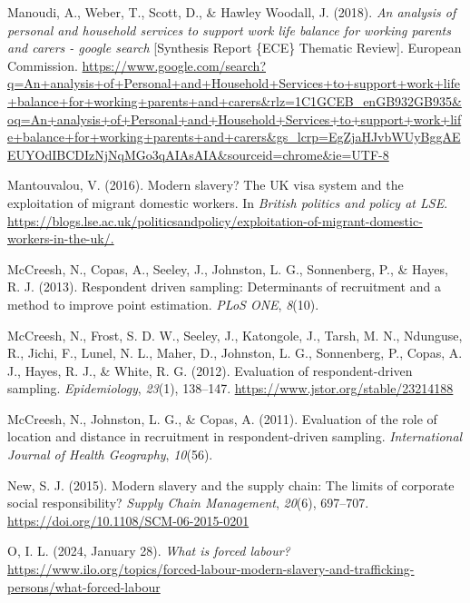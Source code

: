 \documentclass[
  12pt,
]{article}
\newlength{\cslhangindent}
\newenvironment{CSLReferences}[2] %
 {\begin{list}{}{%
  \setlength{\itemindent}{0pt}
  \setlength{\leftmargin}{0pt}
  \setlength{\parsep}{0pt}
  \ifodd #1
   \setlength{\leftmargin}{\cslhangindent}
   \setlength{\itemindent}{-1\cslhangindent}
  \fi
  \setlength{\itemsep}{#2\baselineskip}}}
 {\end{list}}
\theoremstyle{plain}
\theoremstyle{definition}
\begin{document}
\begin{CSLReferences}{1}{0}
Manoudi, A., Weber, T., Scott, D., \& Hawley Woodall, J. (2018).
\emph{An analysis of personal and household services to support work
life balance for working parents and carers - google search}
{[}Synthesis Report \{ECE\} Thematic Review{]}. European Commission.
\url{https://www.google.com/search?q=An+analysis+of+Personal+and+Household+Services+to+support+work+life+balance+for+working+parents+and+carers&rlz=1C1GCEB_enGB932GB935&oq=An+analysis+of+Personal+and+Household+Services+to+support+work+life+balance+for+working+parents+and+carers&gs_lcrp=EgZjaHJvbWUyBggAEEUYOdIBCDIzNjNqMGo3qAIAsAIA&sourceid=chrome&ie=UTF-8}

Mantouvalou, V. (2016). Modern slavery? The {UK} visa system and the
exploitation of migrant domestic workers. In \emph{British politics and
policy at {LSE}}.
\url{https://blogs.lse.ac.uk/politicsandpolicy/exploitation-of-migrant-domestic-workers-in-the-uk/.}

McCreesh, N., Copas, A., Seeley, J., Johnston, L. G., Sonnenberg, P., \&
Hayes, R. J. (2013). Respondent driven sampling: Determinants of
recruitment and a method to improve point estimation. \emph{{PLoS}
{ONE}}, \emph{8}(10).

McCreesh, N., Frost, S. D. W., Seeley, J., Katongole, J., Tarsh, M. N.,
Ndunguse, R., Jichi, F., Lunel, N. L., Maher, D., Johnston, L. G.,
Sonnenberg, P., Copas, A. J., Hayes, R. J., \& White, R. G. (2012).
Evaluation of respondent-driven sampling. \emph{Epidemiology},
\emph{23}(1), 138--147. \url{https://www.jstor.org/stable/23214188}

McCreesh, N., Johnston, L. G., \& Copas, A. (2011). Evaluation of the
role of location and distance in recruitment in respondent-driven
sampling. \emph{International Journal of Health Geography},
\emph{10}(56).

New, S. J. (2015). Modern slavery and the supply chain: The limits of
corporate social responsibility? \emph{Supply Chain Management},
\emph{20}(6), 697--707. \url{https://doi.org/10.1108/SCM-06-2015-0201}

O, I. L. (2024, January 28). \emph{What is forced labour?}
\url{https://www.ilo.org/topics/forced-labour-modern-slavery-and-trafficking-persons/what-forced-labour}


\end{CSLReferences}
\end{document}
